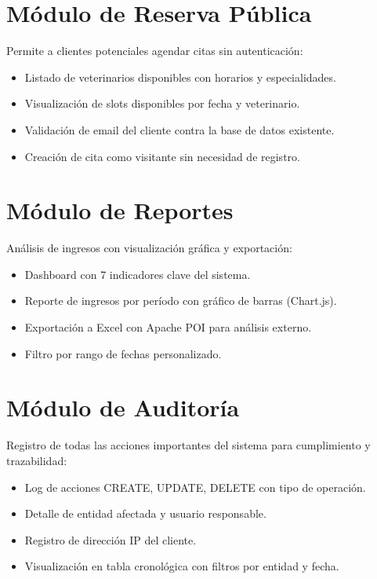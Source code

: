 \section{M\'odulo de Reserva P\'ublica}

Permite a clientes potenciales agendar citas sin autenticaci\'on:

\begin{itemize}
    \item Listado de veterinarios disponibles con horarios y especialidades.
    \item Visualizaci\'on de slots disponibles por fecha y veterinario.
    \item Validaci\'on de email del cliente contra la base de datos existente.
    \item Creaci\'on de cita como visitante sin necesidad de registro.
\end{itemize}

\section{M\'odulo de Reportes}

An\'alisis de ingresos con visualizaci\'on gr\'afica y exportaci\'on:

\begin{itemize}
    \item Dashboard con 7 indicadores clave del sistema.
    \item Reporte de ingresos por per\'iodo con gr\'afico de barras (Chart.js).
    \item Exportaci\'on a Excel con Apache POI para an\'alisis externo.
    \item Filtro por rango de fechas personalizado.
\end{itemize}

\section{M\'odulo de Auditor\'ia}

Registro de todas las acciones importantes del sistema para cumplimiento y trazabilidad:

\begin{itemize}
    \item Log de acciones CREATE, UPDATE, DELETE con tipo de operaci\'on.
    \item Detalle de entidad afectada y usuario responsable.
    \item Registro de direcci\'on IP del cliente.
    \item Visualizaci\'on en tabla cronol\'ogica con filtros por entidad y fecha.
\end{itemize}

